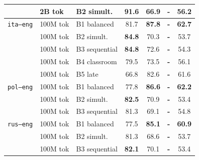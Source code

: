 \begin{table}[t]
\begin{minipage}[t]{0.49\linewidth}
\begin{tabular}{ll l cc cc}
\addlinespace[1.5pt]
 & 2B tok & B2 simult. & \cellcolor[rgb]{0.770,1.000,0.770} 91.6 & \cellcolor[rgb]{0.908,1.000,0.908} 66.9 & \textbf{-} & \cellcolor[rgb]{0.949,1.000,0.949} 56.2 \\
\midrule
\texttt{ita--eng} & 100M tok & B1 balanced & \cellcolor[rgb]{0.825,1.000,0.825} 81.7 & \cellcolor[rgb]{0.794,1.000,0.794} \textbf{87.8} & \textbf{-} & \cellcolor[rgb]{0.895,1.000,0.895} \textbf{62.7} \\
 & 100M tok & B2 simult. & \cellcolor[rgb]{0.807,1.000,0.807} \textbf{84.8} & \cellcolor[rgb]{0.889,1.000,0.889} 70.3 & \textbf{-} & \cellcolor[rgb]{0.970,1.000,0.970} 53.7 \\
 & 100M tok & B3 sequential & \cellcolor[rgb]{0.807,1.000,0.807} \textbf{84.8} & \cellcolor[rgb]{0.877,1.000,0.877} 72.6 & \textbf{-} & \cellcolor[rgb]{0.965,1.000,0.965} 54.3 \\
 & 100M tok & B4 classroom & \cellcolor[rgb]{0.837,1.000,0.837} 79.5 & \cellcolor[rgb]{0.872,1.000,0.872} 73.5 & \textbf{-} & \cellcolor[rgb]{0.950,1.000,0.950} 56.1 \\
 & 100M tok & B5 late & \cellcolor[rgb]{0.907,1.000,0.907} 66.8 & \cellcolor[rgb]{0.822,1.000,0.822} 82.6 & \textbf{-} & \cellcolor[rgb]{0.905,1.000,0.905} 61.6 \\
\midrule
\texttt{pol--eng} & 100M tok & B1 balanced & \cellcolor[rgb]{0.846,1.000,0.846} 77.8 & \cellcolor[rgb]{0.800,1.000,0.800} \textbf{86.6} & \textbf{-} & \cellcolor[rgb]{0.900,1.000,0.900} \textbf{62.2} \\
 & 100M tok & B2 simult. & \cellcolor[rgb]{0.820,1.000,0.820} \textbf{82.5} & \cellcolor[rgb]{0.886,1.000,0.886} 70.9 & \textbf{-} & \cellcolor[rgb]{0.972,1.000,0.972} 53.4 \\
 & 100M tok & B3 sequential & \cellcolor[rgb]{0.827,1.000,0.827} 81.3 & \cellcolor[rgb]{0.896,1.000,0.896} 69.1 & \textbf{-} & \cellcolor[rgb]{0.960,1.000,0.960} 54.8 \\
\midrule
\texttt{rus--eng} & 100M tok & B1 balanced & \cellcolor[rgb]{0.848,1.000,0.848} 77.5 & \cellcolor[rgb]{0.809,1.000,0.809} \textbf{85.1} & \textbf{-} & \cellcolor[rgb]{0.910,1.000,0.910} \textbf{60.9} \\
 & 100M tok & B2 simult. & \cellcolor[rgb]{0.827,1.000,0.827} 81.3 & \cellcolor[rgb]{0.899,1.000,0.899} 68.6 & \textbf{-} & \cellcolor[rgb]{0.970,1.000,0.970} 53.7 \\
 & 100M tok & B3 sequential & \cellcolor[rgb]{0.822,1.000,0.822} \textbf{82.1} & \cellcolor[rgb]{0.890,1.000,0.890} 70.1 & \textbf{-} & \cellcolor[rgb]{0.972,1.000,0.972} 53.4 \\

\end{tabular}
\end{minipage}
\end{table}
